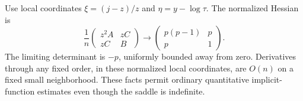 \documentclass[11pt,a4paper]{article}
\numberwithin{equation}{section}
\theoremstyle{definition}
\theoremstyle{remark}
\begin{document}
Use local coordinates $\xi=(j-z)/z$ and $\eta=y-\log\tau$.
The normalized Hessian is
\begin{equation}
 \frac1n\begin{pmatrix}z^2A&zC\\zC&B\end{pmatrix}
 \longrightarrow
 \begin{pmatrix}p(p-1)&p\\p&1\end{pmatrix}.
 \label{eq:Hnorm}
\end{equation}
The limiting determinant is $-p$, uniformly bounded away from zero.
Derivatives through any fixed order, in these normalized local coordinates,
are $O(n)$ on a fixed small neighborhood. These facts permit ordinary
quantitative implicit-function estimates even though the saddle is indefinite.
\end{document}
